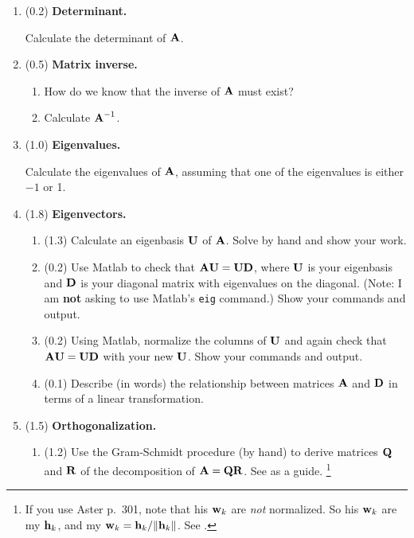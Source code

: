 \begin{enumerate}
\item (0.2) {\bf Determinant.}

Calculate the determinant of $\mbox{${\bf A}$}$.

\item (0.5) {\bf Matrix inverse.}

\begin{enumerate}
\item How do we know that the inverse of $\mbox{${\bf A}$}$ must exist?
\item Calculate $\mbox{${\bf A}$}^{-1}$.
\end{enumerate}

\item (1.0) {\bf Eigenvalues.}

Calculate the eigenvalues of $\mbox{${\bf A}$}$, assuming that one of the eigenvalues is either $-1$ or 1.

\item (1.8) {\bf Eigenvectors.}

\begin{enumerate}
\item (1.3) Calculate an eigenbasis $\mbox{${\bf U}$}$ of $\mbox{${\bf A}$}$. Solve by hand and show your work.

\item (0.2) Use Matlab to check that $\mbox{${\bf A}$}\mbox{${\bf U}$} = \mbox{${\bf U}$}\mbox{${\bf D}$}$, where $\mbox{${\bf U}$}$ is your eigenbasis and $\mbox{${\bf D}$}$ is your diagonal matrix with eigenvalues on the diagonal. (Note: I am {\bf not} asking to use Matlab's \verb+eig+ command.) Show your commands and output.

\item (0.2) Using Matlab, normalize the columns of $\mbox{${\bf U}$}$ and again check that $\mbox{${\bf A}$}\mbox{${\bf U}$} = \mbox{${\bf U}$}\mbox{${\bf D}$}$ with your new $\mbox{${\bf U}$}$. Show your commands and output.

\item (0.1) Describe (in words) the relationship between matrices $\mbox{${\bf A}$}$ and $\mbox{${\bf D}$}$ in terms of a linear transformation.

\end{enumerate}

\pagebreak
\item (1.5) {\bf Orthogonalization.}

\begin{enumerate}
\item (1.2) Use the Gram-Schmidt procedure (by hand) to derive matrices $\mbox{${\bf Q}$}$ and $\mbox{${\bf R}$}$ of the decomposition of $\mbox{${\bf A}$} = \mbox{${\bf Q}$}\mbox{${\bf R}$}$. See  as a guide.
\footnote{If you use Aster p.~301, note that his $\mbox{${\bf w}$}_k$ are {\em not} normalized. So his $\mbox{${\bf w}$}_k$ are my $\mbox{${\bf h}$}_k$, and my $\mbox{${\bf w}$}_k = \mbox{${\bf h}$}_k/\|\mbox{${\bf h}$}_k\|$. See .}


\end{enumerate}
\end{enumerate}

